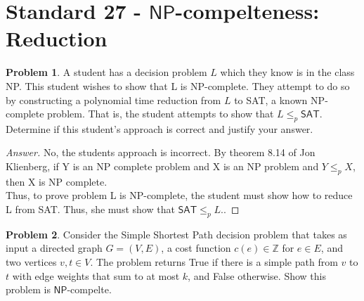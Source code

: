 \documentclass[11pt]{article}
\theoremstyle{definition}
\theoremstyle{definition}
\newtheorem{required}{Problem}
\theoremstyle{definition}
\begin{document}
\newpage
\section{Standard 27 - $\textsf{NP}$-compelteness: Reduction}
\begin{required} \label{S30Prob1}
A student has a decision problem $L$ which they know is in the class \textsf{NP}. This student wishes to show that L is \textsf{NP}-complete. They attempt to do so by constructing a polynomial time reduction from $L$ to \textsf{SAT}, a known \textsf{NP}-complete problem. That is, the student attempts to show that $L \leq_{p} \textsf{SAT}.$ Determine if this student’s approach is
correct and justify your answer.
\end{required}

\begin{proof}[Answer]
No, the students approach is incorrect. By theorem 8.14 of Jon Klienberg, if Y is an NP complete problem and X is an NP problem and $Y \leq_{p} X$, then X is NP complete. \\
Thus, to prove problem L is NP-complete, the student must show how to reduce L from SAT. Thus, she must show that $\textsf{SAT}\leq_{p} L.$.

\end{proof}



\newpage
\begin{required} \label{NPcomp}
Consider the Simple Shortest Path decision problem that takes as input a
directed graph $G=(V,E)$, a cost function $c(e)\in \mathbb{Z}$ for $e \in E$,
and two vertices $v,t\in V$. The problem returns True if there is a simple path from
$v$ to $t$ with edge weights that sum to at most $k$, and False otherwise.
Show this problem is $\textsf{NP}$-compelte.
\end{required}
\end{document}
